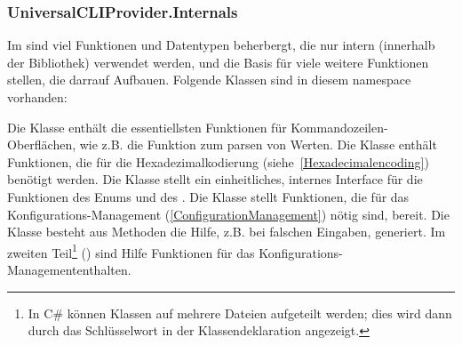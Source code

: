 \subsubsection{UniversalCLIProvider.Internals}
Im  sind viel Funktionen und Datentypen beherbergt, die nur intern (innerhalb der Bibliothek) verwendet werden,
und die Basis für viele weitere Funktionen stellen, die darrauf Aufbauen.
Folgende Klassen sind in diesem namespace vorhanden:
\begin{outline}
 \1 Die  Klasse enthält die essentiellsten Funktionen für Kommandozeilen-Oberflächen, wie z.B. die Funktion zum parsen von Werten.
 \1 Die  Klasse enthält Funktionen, die für die Hexadezimalkodierung (siehe~\ref{Hexadecimalencoding}) benötigt werden.
 \1 Die  Klasse stellt ein einheitliches, internes Interface für die Funktionen des  Enums und des .
 \1 Die  Klasse stellt Funktionen, die für das Konfigurations-Management (\ref{ConfigurationManagement}) nötig sind, bereit.
 \1 Die  Klasse besteht aus Methoden die Hilfe, z.B. bei falschen Eingaben, generiert.
 Im zweiten Teil\footnote{In C\# können Klassen auf mehrere Dateien aufgeteilt werden; dies wird dann durch das  Schlüsselwort in der Klassendeklaration angezeigt.}
 () sind Hilfe Funktionen für das Konfigurations-Managemententhalten.
\end{outline}
